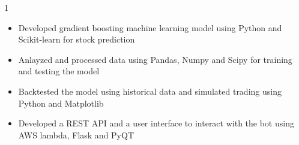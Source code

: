 \documentclass[11pt,a4paper,ragged2e]{altacv}
\begin{document}
\begin{paracol}{1}
\tightdivider







\begin{itemize}
\item Developed gradient boosting machine learning model using Python and Scikit-learn for stock prediction
\item Anlayzed and processed data using Pandas, Numpy and Scipy for training and testing the model 
\item Backtested the model using historical data and simulated trading using Python and Matplotlib
\item Developed a REST API and a user interface to interact with the bot using AWS lambda, Flask and PyQT
\end{itemize}


\end{paracol}
\end{document}

